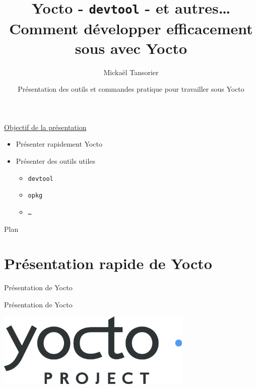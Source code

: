 \documentclass[compress]{beamer}
\title[Yocto]{Yocto - \texttt{devtool} - et autres… \\ \textbf{Comment développer efficacement sous avec Yocto}}
\author[Mickaël Tansorier]{Mickaël Tansorier}
\date[Mars 2018]{Présentation des outils et commandes pratique pour travailler sous Yocto}
\begin{document}


\begin{frame}
\titlepage
\end{frame}



\begin{frame}
\underline{Objectif de la présentation}
\begin{itemize}
	\item Présenter rapidement Yocto
	\item Présenter des outils utiles
	\begin{itemize}
		\item \texttt{devtool}
		\item \texttt{opkg}
		\item \texttt{…}
	\end{itemize}
\end{itemize}
\end{frame}


\begin{frame}{Plan}
\tableofcontents[hideallsubsections]
\end{frame}

\section{Présentation rapide de Yocto}

\begin{frame}{Présentation de Yocto}
\end{frame}

\begin{frame}{Présentation de Yocto}
\begin{center}
\includegraphics[width=0.7\textwidth]{logos/yocto-project-transp.png}
\end{center}
\end{frame}
\end{document}
